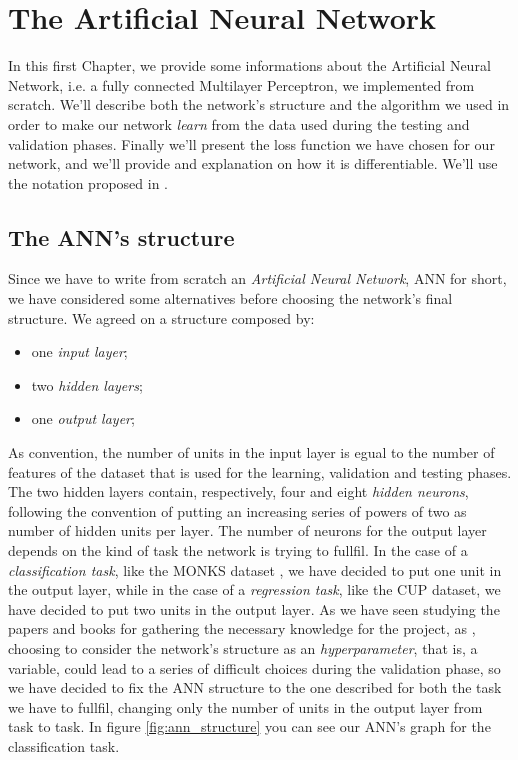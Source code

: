\chapter{The Artificial Neural Network} %
\label{cha:the_artificial_neural_network}
	In this first Chapter, we provide some informations about the Artificial Neural Network, i.e. a fully
	connected Multilayer Perceptron, we implemented from scratch. We'll describe both the network's structure and
	the algorithm we used in order to make our network \textit{learn} from the data used during the testing and
	validation phases. Finally we'll present the loss function we have chosen for our network, and we'll provide
	and explanation on how it is differentiable. We'll use the notation proposed in \cite{Goodfellow-et-al-2016}.

	\section{The ANN's structure} %
	\label{sec:the_ann_s_structure}
		Since we have to write from scratch an \textit{Artificial Neural Network}, ANN for short, we have
		considered some alternatives before choosing the network's final structure. We agreed on a structure
		composed by:

		\begin{itemize}
			\item one \textit{input layer};
			\item two \textit{hidden layers};
			\item one \textit{output layer};
		\end{itemize}

		As convention, the number of units in the input layer is egual to the number
		of features of the dataset that is used for the learning, validation and testing phases. The two
		hidden layers contain, respectively, four and eight \textit{hidden neurons}, following the convention of
		putting an increasing series of powers of two as number of hidden units per layer. The number of neurons
		for the output layer depends on the kind of task the network is trying to fullfil. In the case of a
		\textit{classification task}, like the MONKS dataset \cite{Dua:2019}, we have decided to put one unit in
		the output layer, while in the case of a \textit{regression task}, like the CUP dataset, we have decided to
		put two units in the output layer. As we have seen studying the papers and books for gathering the
		necessary knowledge for the project, as \cite{Goodfellow-et-al-2016,haykin2009neural,mitchell1997machine},
		choosing to consider the network's structure as an \textit{hyperparameter}, that is, a variable, could
		lead to a series of difficult choices during the validation phase, so we have decided to fix the ANN
		structure to the one described for both the task we have to fullfil, changing only the number of units in
		the output layer from task to task. In figure \ref{fig:ann_structure} you can see our ANN's graph for
		the classification task.

